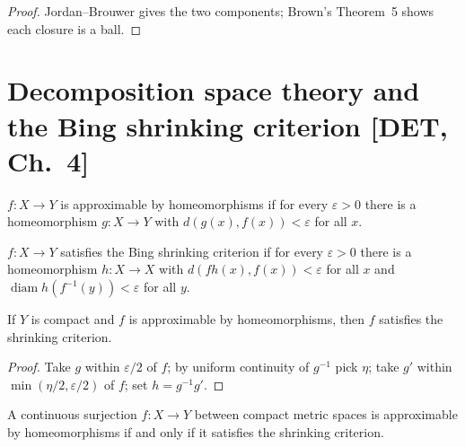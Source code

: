 \begin{proof}
  \leanok
  Jordan--Brouwer gives the two components; Brown's Theorem~5 shows each closure
  is a ball.
\end{proof}

\section{Decomposition space theory and the Bing shrinking criterion [DET, Ch.~4]}

\begin{definition}
  \label{def:approx}
  \leanok
  $f\colon X \to Y$ is approximable by homeomorphisms if for every
  $\varepsilon>0$ there is a homeomorphism $g\colon X\to Y$ with
  $d(g(x), f(x))<\varepsilon$ for all $x$.
\end{definition}

\begin{definition}
  \label{def:bsc}
  \leanok
  $f\colon X\to Y$ satisfies the Bing shrinking criterion if for every
  $\varepsilon>0$ there is a homeomorphism $h\colon X\to X$ with
  $d(fh(x), f(x)) < \varepsilon$ for all $x$ and
  $\operatorname{diam} h(f^{-1}(y)) < \varepsilon$ for all $y$.
\end{definition}

\begin{lemma}
  \label{lem:bsc-easy}
  \leanok
  If $Y$ is compact and $f$ is approximable by homeomorphisms, then $f$
  satisfies the shrinking criterion.
\end{lemma}

\begin{proof}
  \leanok
  Take $g$ within $\varepsilon/2$ of $f$; by uniform continuity of $g^{-1}$ pick
  $\eta$; take $g'$ within $\min(\eta/2,\varepsilon/2)$ of $f$; set
  $h=g^{-1}g'$.
\end{proof}

\begin{theorem}
  \label{thm:bsc}
  \leanok
  A continuous surjection $f\colon X\to Y$ between compact metric spaces is
  approximable by homeomorphisms if and only if it satisfies the shrinking
  criterion.
\end{theorem}


